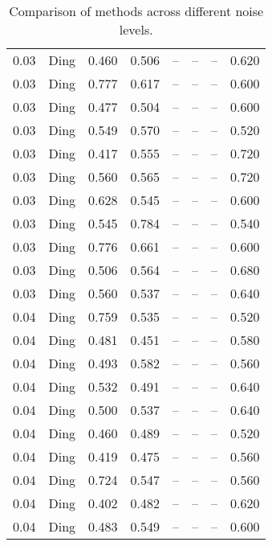 \begin{table}[H]
\begin{tabular}{l c l l l}
0.03 & Ding & 0.460 & 0.506 & -- & -- & -- & 0.620 \\
0.03 & Ding & 0.777 & 0.617 & -- & -- & -- & 0.600 \\
0.03 & Ding & 0.477 & 0.504 & -- & -- & -- & 0.600 \\
0.03 & Ding & 0.549 & 0.570 & -- & -- & -- & 0.520 \\
0.03 & Ding & 0.417 & 0.555 & -- & -- & -- & 0.720 \\
0.03 & Ding & 0.560 & 0.565 & -- & -- & -- & 0.720 \\
0.03 & Ding & 0.628 & 0.545 & -- & -- & -- & 0.600 \\
0.03 & Ding & 0.545 & 0.784 & -- & -- & -- & 0.540 \\
0.03 & Ding & 0.776 & 0.661 & -- & -- & -- & 0.600 \\
0.03 & Ding & 0.506 & 0.564 & -- & -- & -- & 0.680 \\
0.03 & Ding & 0.560 & 0.537 & -- & -- & -- & 0.640 \\
0.04 & Ding & 0.759 & 0.535 & -- & -- & -- & 0.520 \\
0.04 & Ding & 0.481 & 0.451 & -- & -- & -- & 0.580 \\
0.04 & Ding & 0.493 & 0.582 & -- & -- & -- & 0.560 \\
0.04 & Ding & 0.532 & 0.491 & -- & -- & -- & 0.640 \\
0.04 & Ding & 0.500 & 0.537 & -- & -- & -- & 0.640 \\
0.04 & Ding & 0.460 & 0.489 & -- & -- & -- & 0.520 \\
0.04 & Ding & 0.419 & 0.475 & -- & -- & -- & 0.560 \\
0.04 & Ding & 0.724 & 0.547 & -- & -- & -- & 0.560 \\
0.04 & Ding & 0.402 & 0.482 & -- & -- & -- & 0.620 \\
0.04 & Ding & 0.483 & 0.549 & -- & -- & -- & 0.600 \\
\midrule
\bottomrule
\end{tabular}
\label{tab:SyntheticNoise}
\caption{Comparison of methods across different noise levels.}
\end{table}
